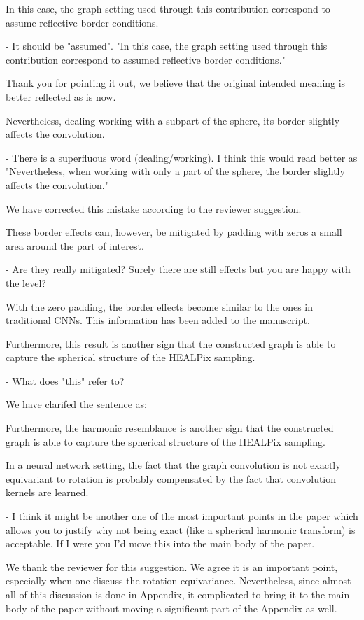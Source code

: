 \documentclass[12pt,a4paper]{article}
\newcommand{\todo}[1]{{\color[rgb]{.6,.1,.6}{TODO: #1}}}
\newcommand{\1}{\b{1}}              %
\newcommand{\0}{\b{0}}              %
\begin{document}
\begin{mdframed}[style=comment]
In this case, the graph setting used through this contribution correspond to assume reflective border conditions.

- It should be "assumed". "In this case, the graph setting used through this contribution correspond to assumed reflective border conditions."
\end{mdframed}
Thank you for pointing it out, we believe that the original intended meaning is better reflected as is now.

\begin{mdframed}[style=comment]
Nevertheless, dealing working with a subpart of the sphere, its border slightly affects the convolution.

- There is a superfluous word (dealing/working). I think this would read better as "Nevertheless, when working with only a part of the sphere, the border slightly affects the convolution."
\end{mdframed}
We have corrected this mistake according to the reviewer suggestion.

\begin{mdframed}[style=comment]
These border effects can, however, be mitigated by padding with zeros a small area around the part of interest.

- Are they really mitigated? Surely there are still effects but you are happy with the level?
\end{mdframed}
\todo{Assign: @nati, @michael}
With the zero padding, the border effects become similar to the ones in traditional CNNs.
This information has been added to the manuscript.

\begin{mdframed}[style=comment]
Furthermore, this result is another sign that the constructed graph is able to capture the spherical structure of the HEALPix sampling.

- What does "this" refer to?
\end{mdframed}
We have clarifed the sentence as:
\begin{mdframed}[style=manuscript]
Furthermore, the harmonic resemblance is another sign that the constructed graph is able to capture the spherical
structure of the HEALPix sampling.
\end{mdframed}

\begin{mdframed}[style=comment]
In a neural network setting, the fact that the graph convolution is not exactly equivariant to rotation is probably compensated by the fact that convolution kernels are learned.

- I think it might be another one of the most important points in the paper which allows you to justify why not being exact (like a spherical harmonic transform) is acceptable. If I were you I'd move this into the main body of the paper.
\end{mdframed}
We thank the reviewer for this suggestion. We agree it is an important point, especially when one discuss the rotation equivariance. Nevertheless, since almost all of this discussion is done in Appendix, it complicated to bring it to the main body of the paper without moving a significant part of the Appendix as well.
\todo{To check: @all}
\end{document}
